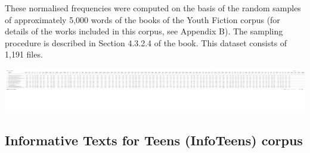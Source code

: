 \documentclass[
  letterpaper,
  DIV=11,
  numbers=noendperiod]{scrreprt}
\newenvironment{Shaded}{\begin{snugshade}}{\end{snugshade}}
\newcommand{\AttributeTok}[1]{\textcolor[rgb]{0.40,0.45,0.13}{#1}}
\newcommand{\ConstantTok}[1]{\textcolor[rgb]{0.56,0.35,0.01}{#1}}
\newcommand{\FunctionTok}[1]{\textcolor[rgb]{0.28,0.35,0.67}{#1}}
\newcommand{\NormalTok}[1]{\textcolor[rgb]{0.00,0.23,0.31}{#1}}
\newcommand{\OtherTok}[1]{\textcolor[rgb]{0.00,0.23,0.31}{#1}}
\newcommand{\SpecialCharTok}[1]{\textcolor[rgb]{0.37,0.37,0.37}{#1}}
\newcommand{\StringTok}[1]{\textcolor[rgb]{0.13,0.47,0.30}{#1}}
\begin{document}
\begin{Shaded}
\end{Shaded}

These normalised frequencies were computed on the basis of the random
samples of approximately 5,000 words of the books of the Youth Fiction
corpus (for details of the works included in this corpus, see Appendix
B). The sampling procedure is described in Section 4.3.2.4 of the book.
This dataset consists of 1,191 files.

\includegraphics{AppendixG_files/figure-pdf/unnamed-chunk-3-1.pdf}

\subsection{Informative Texts for Teens (InfoTeens)
corpus}\label{informative-texts-for-teens-infoteens-corpus}
\end{document}
